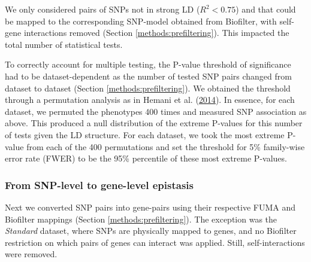 \documentclass[
  11pt,
]{env/yjiao}
\begin{document}
We only considered pairs of SNPs not in strong LD (\(R^{2}<0.75\)) and
that could be mapped to the corresponding SNP-model obtained from
Biofilter, with self-gene interactions removed (Section
\ref{methods:prefiltering}). This impacted the total number of
statistical tests.

To correctly account for multiple testing, the P-value threshold of
significance had to be dataset-dependent as the number of tested SNP
pairs changed from dataset to dataset (Section
\ref{methods:prefiltering}). We obtained the threshold through a
permutation analysis as in Hemani et al. (\protect\hyperlink{ref-hemani_detection_2014}{2014}). In essence,
for each dataset, we permuted the phenotypes 400 times and measured SNP
association as above. This produced a null distribution of the extreme
P-values for this number of tests given the LD structure. For each
dataset, we took the most extreme P-value from each of the 400
permutations and set the threshold for 5\% family-wise error rate
(FWER) to be the 95\% percentile of these most extreme P-values.

\hypertarget{methods:gene-networks}{%
\subsubsection{From SNP-level to gene-level epistasis}\label{methods:gene-networks}}

Next we converted SNP pairs into gene-pairs using their respective FUMA
and Biofilter mappings (Section \ref{methods:prefiltering}).
The exception was the \emph{Standard}
dataset, where SNPs are physically mapped to genes, and no Biofilter
restriction on which pairs of genes can interact was applied. Still,
self-interactions were removed.
\end{document}
